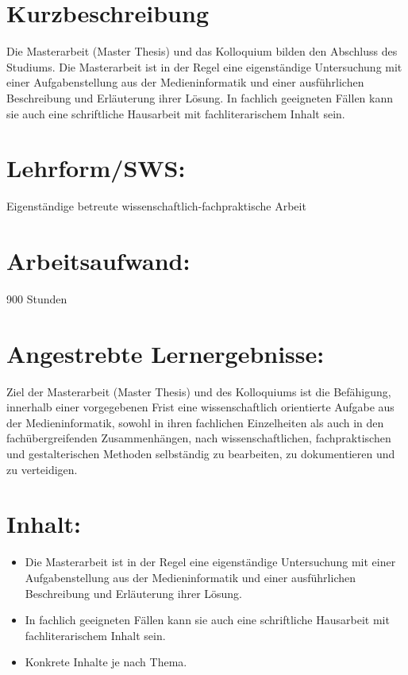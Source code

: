 \section*{Kurzbeschreibung}\label{kurzbeschreibung}

Die Masterarbeit (Master Thesis) und das Kolloquium bilden den Abschluss
des Studiums. Die Masterarbeit ist in der Regel eine eigenständige
Untersuchung mit einer Aufgabenstellung aus der Medieninformatik und
einer ausführlichen Beschreibung und Erläuterung ihrer Lösung. In
fachlich geeigneten Fällen kann sie auch eine schriftliche Hausarbeit
mit fachliterarischem Inhalt sein.

\section*{Lehrform/SWS:}\label{lehrformsws-1}

Eigenständige betreute wissenschaftlich-fachpraktische Arbeit

\section*{Arbeitsaufwand:}\label{arbeitsaufwand-1}

900 Stunden

\section*{Angestrebte
Lernergebnisse:}\label{angestrebte-lernergebnisse-1}

Ziel der Masterarbeit (Master Thesis) und des Kolloquiums ist die
Befähigung, innerhalb einer vorgegebenen Frist eine wissenschaftlich
orientierte Aufgabe aus der Medieninformatik, sowohl in ihren fachlichen
Einzelheiten als auch in den fachübergreifenden Zusammenhängen, nach
wissenschaftlichen, fachpraktischen und gestalterischen Methoden
selbständig zu bearbeiten, zu dokumentieren und zu verteidigen.

\section*{Inhalt:}\label{inhalt-1}

\begin{itemize}
\tightlist
\item
  Die Masterarbeit ist in der Regel eine eigenständige Untersuchung mit
  einer Aufgabenstellung aus der Medieninformatik und einer
  ausführlichen Beschreibung und Erläuterung ihrer Lösung.
\item
  In fachlich geeigneten Fällen kann sie auch eine schriftliche
  Hausarbeit mit fachliterarischem Inhalt sein.
\item
  Konkrete Inhalte je nach Thema.
\end{itemize}


